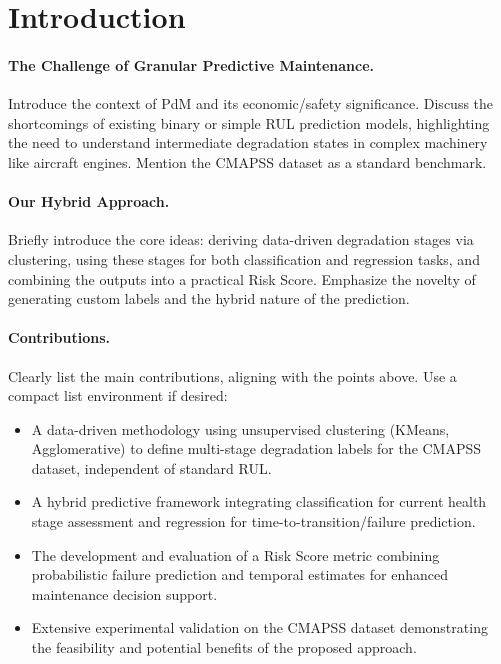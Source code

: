 \section{Introduction}
\label{sec:intro}

\paragraph{The Challenge of Granular Predictive Maintenance.}
Introduce the context of PdM and its economic/safety significance. Discuss the shortcomings of existing binary or simple RUL prediction models, highlighting the need to understand intermediate degradation states in complex machinery like aircraft engines. Mention the CMAPSS dataset as a standard benchmark.

\paragraph{Our Hybrid Approach.}
Briefly introduce the core ideas: deriving data-driven degradation stages via clustering, using these stages for both classification and regression tasks, and combining the outputs into a practical Risk Score. Emphasize the novelty of generating custom labels and the hybrid nature of the prediction.

\paragraph{Contributions.}
Clearly list the main contributions, aligning with the points above. Use a compact list environment if desired:
\begin{itemize}
	\item A data-driven methodology using unsupervised clustering (KMeans, Agglomerative) to define multi-stage degradation labels for the CMAPSS dataset, independent of standard RUL.
	\item A hybrid predictive framework integrating classification for current health stage assessment and regression for time-to-transition/failure prediction.
	\item The development and evaluation of a Risk Score metric combining probabilistic failure prediction and temporal estimates for enhanced maintenance decision support.
	\item Extensive experimental validation on the CMAPSS dataset demonstrating the feasibility and potential benefits of the proposed approach.
\end{itemize}

